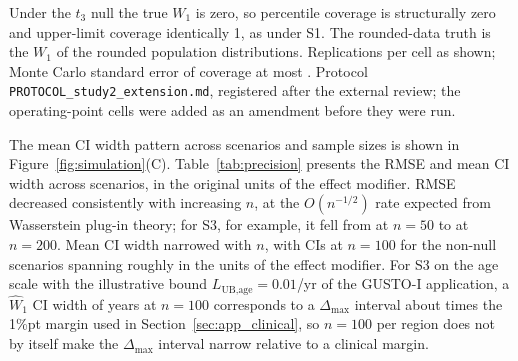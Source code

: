 \documentclass[AMA,Times1COL]{WileyNJDv5}
\begin{document}
\begin{table}[ht]
\centering
\caption{Registered extension of Study 2: unequal regional sizes, a $t_3$ reference distribution, integer-grid data, $n = 1{,}000$ per region and the application's operating point (0.2 SD). Bias, RMSE and mean width in the original units; coverage of the 95\% percentile interval and of its one-sided 97.5\% upper limit.\label{tab:study2_ext}}
\begin{tablenotes}
\item Under the $t_3$ null the true $W_1$ is zero, so percentile coverage is structurally zero and upper-limit coverage identically 1, as under S1. The rounded-data truth is the $W_1$ of the rounded population distributions. Replications per cell as shown; Monte Carlo standard error of coverage at most . Protocol \texttt{PROTOCOL\_study2\_extension.md}, registered after the external review; the operating-point cells were added as an amendment before they were run.
\end{tablenotes}
\end{table}

The mean CI width pattern across scenarios and sample sizes is shown in Figure~\ref{fig:simulation}(C). Table~\ref{tab:precision} presents the RMSE and mean CI width across scenarios, in the original units of the effect modifier. RMSE decreased consistently with increasing $n$, at the $O(n^{-1/2})$ rate expected from Wasserstein plug-in theory; for S3, for example, it fell from  at $n=50$ to  at $n=200$. Mean CI width narrowed with $n$, with CIs at $n = 100$ for the non-null scenarios spanning roughly  in the units of the effect modifier. For S3 on the age scale with the illustrative bound $L_{\text{UB,age}} = 0.01$/yr of the GUSTO-I application, a $\widehat{W}_1$ CI width of  years at $n = 100$ corresponds to a $\Delta_{\max}$ interval about  times the 1\%pt margin used in Section~\ref{sec:app_clinical}, so $n = 100$ per region does not by itself make the $\Delta_{\max}$ interval narrow relative to a clinical margin.
\end{document}
